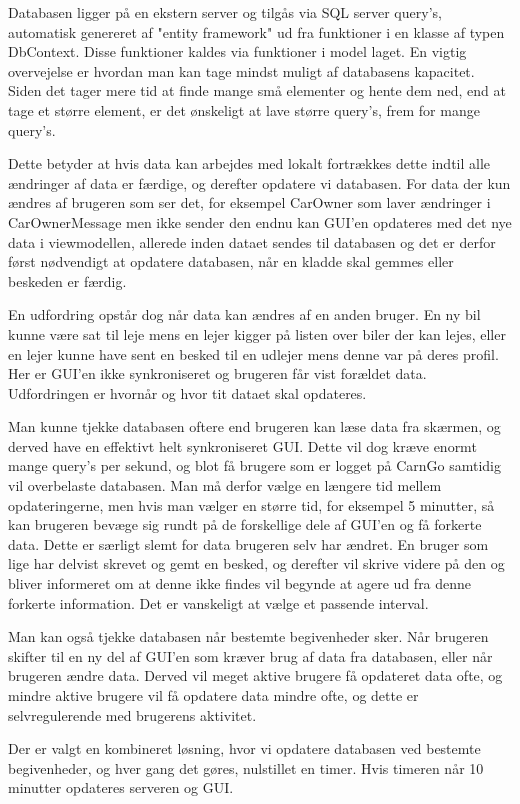 \documentclass[SoftwareDesign/SoftwareDesign_main.tex]{subfiles}
\begin{document}
Databasen ligger på en ekstern server og tilgås via SQL server query's, automatisk genereret af "entity framework" ud fra funktioner i en klasse af typen DbContext. Disse funktioner kaldes via funktioner i model laget. En vigtig overvejelse er hvordan man kan tage mindst muligt af databasens kapacitet. Siden det tager mere tid at finde mange små elementer og hente dem ned, end at tage et større element, er det ønskeligt at lave større query's, frem for mange query's.

Dette betyder at hvis data kan arbejdes med lokalt fortrækkes dette indtil alle ændringer af data er færdige, og derefter opdatere vi databasen.
For data der kun ændres af brugeren som ser det, for eksempel CarOwner som laver ændringer i CarOwnerMessage men ikke sender den endnu kan GUI'en opdateres med det nye data i viewmodellen, allerede inden dataet sendes til databasen og det er derfor først nødvendigt at opdatere databasen, når en kladde skal gemmes eller beskeden er færdig.

En udfordring opstår dog når data kan ændres af en anden bruger. En ny bil kunne være sat til leje mens en lejer kigger på listen over biler der kan lejes, eller en lejer kunne have sent en besked til en udlejer mens denne var på deres profil. Her er GUI'en ikke synkroniseret og brugeren får vist forældet data.
Udfordringen er hvornår og hvor tit dataet skal opdateres.

Man kunne tjekke databasen oftere end brugeren kan læse data fra skærmen, og derved have en effektivt helt synkroniseret GUI. Dette vil dog kræve enormt mange query's per sekund, og blot få brugere som er logget på CarnGo samtidig vil overbelaste databasen. Man må derfor vælge en længere tid mellem opdateringerne, men hvis man vælger en større tid, for eksempel 5 minutter, så kan brugeren bevæge sig rundt på de forskellige dele af GUI'en og få forkerte data. Dette er særligt slemt for data brugeren selv har ændret. En bruger som lige har delvist skrevet og gemt en besked, og derefter vil skrive videre på den og bliver informeret om at denne ikke findes vil begynde at agere ud fra denne forkerte information. Det er vanskeligt at vælge et passende interval.

Man kan også tjekke databasen når bestemte begivenheder sker. Når brugeren skifter til en ny del af GUI'en som kræver brug af data fra databasen, eller når brugeren ændre data. Derved vil meget aktive brugere få opdateret data ofte, og mindre aktive brugere vil få opdatere data mindre ofte, og dette er selvregulerende med brugerens aktivitet. 

Der er valgt en kombineret løsning, hvor vi opdatere databasen ved bestemte begivenheder, og hver gang det gøres, nulstillet en timer. Hvis timeren når 10 minutter opdateres serveren og GUI.
\end{document}
